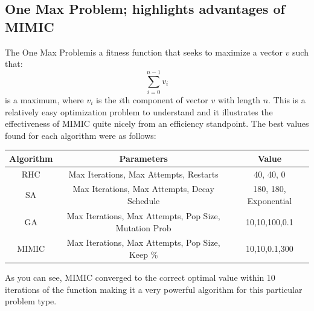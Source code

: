 \documentclass[11pt]{article}
\newcommand{\problemone}{One Max Problem}
\begin{document}
    \subsection{\problemone \hspace{0em}; highlights advantages of MIMIC}
    The \problemone is a fitness function that seeks to maximize a vector $v$ such that:
    \begin{equation}
        \label{oneMax}
        \sum_{i=0}^{n-1} v_i
    \end{equation}
    is a maximum, where $v_i$ is the $i$th component of vector $v$ with length $n$.
    This is a relatively easy optimization problem to understand and it illustrates the effectiveness of MIMIC
    quite nicely from an efficiency standpoint.
    The best values found for each algorithm were as follows:
    \begin{center}
        \begin{tabular}{| c | c | c |}
            \hline
            Algorithm & Parameters                                            & Value                 \\
            \hline
            \hline
            RHC       & Max Iterations, Max Attempts, Restarts                & 40, 40, 0             \\
            \hline
            SA        & Max Iterations, Max Attempts, Decay Schedule          & 180, 180, Exponential \\
            \hline
            GA        & Max Iterations, Max Attempts, Pop Size, Mutation Prob & 10,10,100,0.1         \\
            \hline
            MIMIC     & Max Iterations, Max Attempts, Pop Size, Keep \%       & 10,10,0.1,300         \\
            \hline
        \end{tabular}
    \end{center}
    As you can see, MIMIC converged to the correct optimal value within 10 iterations of the function making it a very
    powerful algorithm for this particular problem type.
\end{document}
